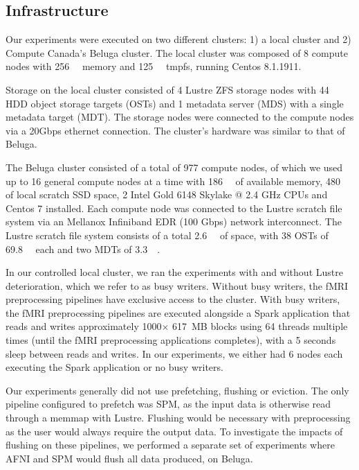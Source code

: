     
    \subsection{Infrastructure}
    
    Our experiments were executed on two different clusters: 1) a local cluster
    and 2) Compute Canada's Beluga cluster. The local cluster was composed of 8
    compute nodes with \SI{256}{\gibi\byte} memory and \SI{125}{\gibi\byte}
    tmpfs, running Centos 8.1.1911.
    
    Storage on the local cluster consisted of 4 Lustre ZFS storage nodes
    with 44 HDD object storage targets (OSTs) and 1 metadata server  (MDS) with
    a single metadata target (MDT). The storage nodes were connected to the
    compute nodes via a 20Gbps ethernet connection. The cluster's hardware was
    similar to that of Beluga.
    
    The Beluga cluster consisted of a total of 977 compute nodes, of which we
    used up to 16 general compute nodes at a time with \SI{186}{\gibi\byte} of
    available memory, \SI{480}{\gibi\byte} of local scratch SSD space, 2 Intel Gold
    6148 Skylake @ 2.4 GHz CPUs and Centos 7 installed. Each compute node was
    connected to the Lustre scratch file system via an Mellanox Infiniband EDR
    (100 Gbps) network interconnect. The Lustre scratch file system consists of a
    total \SI{2.6}{\pebi\byte} of space, with 38 OSTs of \SI{69.8}{\tebi\byte}
    each and two MDTs of \SI{3.3}{\tebi\byte}.

    In our controlled local cluster, we ran the experiments with and without
    Lustre deterioration, which we refer to as busy writers. Without busy writers,
    the fMRI preprocessing pipelines have exclusive access to the cluster. With
    busy writers, the fMRI preprocessing pipelines are executed alongside a
    Spark application that reads and writes approximately 1000$\times$ 617~MB
    blocks using 64 threads multiple times (until the fMRI preprocessing
    applications completes), with a 5 seconds sleep between reads and writes. In
    our experiments, we either had 6 nodes each executing the Spark application
    or no busy writers.

    Our experiments generally did not use prefetching, flushing or eviction. The only
    pipeline configured to prefetch was SPM, as the input data is otherwise read through
    a memmap with Lustre. Flushing would be necessary with preprocessing as the user would always
    require the output data. To investigate the impacts of flushing on these pipelines, we performed
    a separate set of experiments where AFNI and SPM would flush all data produced, on Beluga.

